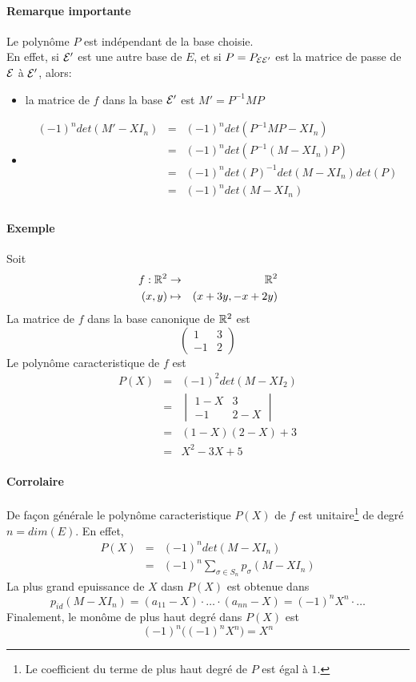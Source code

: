 \paragraph{Remarque importante} Le polynôme $P$ est indépendant de la base choisie. \\
En effet, si $\mathcal{E}'$ est une autre base de $E$, et si $P = P_{\mathcal{E} \mathcal{E}'}$ est la matrice de passe de $\mathcal{E}$ à $\mathcal{E}'$, alors:
\begin{itemize}
  \item la matrice de $f$ dans la base $\mathcal{E}'$ est $M' = P^{-1} M P$
  \item 
    \begin{eqnarray*}
      (-1)^{n} det(M' - X I_n) &=& (-1)^{n} det(P^{-1} M P - X I_n) \\
        &=& (-1)^{n} det(P^{-1} (M - X I_n) P) \\
        &=& (-1)^{n} det(P)^{-1} det(M - X I_n) det(P) \\
        &=& (-1)^{n} det(M - X I_n) \\
    \end{eqnarray*}
\end{itemize}

\paragraph{Exemple} Soit 
\begin{eqnarray*}
  f: \mathbb{R}^2 &\rightarrow& \mathbb{R}^2 \\
  (x, y) &\mapsto& (x + 3y, -x + 2y)
\end{eqnarray*}
La matrice de $f$ dans la base canonique de $\mathbb{R}^2$ est 
$$\begin{pmatrix} 1 & 3 \\ -1 & 2 \end{pmatrix}$$
Le polynôme caracteristique de $f$ est
\begin{eqnarray*}
  P(X) &=& (-1)^2 det(M-X I_2) \\
    &=& \begin{vmatrix} 1-X & 3 \\ -1 & 2-X \end{vmatrix} \\
    &=& (1-X)(2-X) + 3 \\
    &=& X^2 -3X + 5 
\end{eqnarray*}

\paragraph{Corrolaire} De façon générale le polynôme caracteristique $P(X)$ de $f$ est unitaire\footnote{Le coefficient du terme de plus haut degré de $P$ est égal à $1$.} de degré $n = dim(E)$. En effet,
\begin{eqnarray*}
  P(X) &=& (-1)^n det(M-X I_n) \\
   &=& (-1)^n \sum_{\sigma \in S_n} p_{\sigma}(M- X I_n)
\end{eqnarray*}
La plus grand epuissance de $X$ dasn $P(X)$ est obtenue dans
$$p_{id}(M - X I_n) = (a_{11} - X) \cdot \ldots \cdot (a_{nn} - X) = (-1)^n X^n \cdot \ldots$$
Finalement, le monôme de plus haut degré dans $P(X)$ est 
$$(-1)^n \big( (-1)^n X^n \big) = X^n$$

